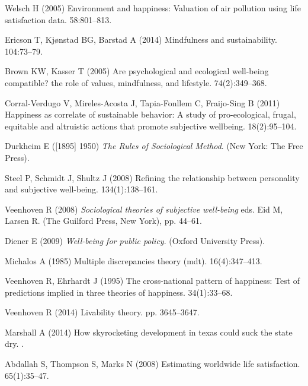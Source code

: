 \documentclass[10pt, letterpaper]{article}
\begin{document}
\begin{spacing}{1.4}
\begin{thebibliography}{10}
Welsch H (2005) Environment and happiness: Valuation of air pollution using
  life satisfaction data.
 58:801--813.

Ericson T, Kj{\o}nstad BG, Barstad A (2014) Mindfulness and sustainability.
 104:73--79.

Brown KW, Kasser T (2005) Are psychological and ecological well-being
  compatible? the role of values, mindfulness, and lifestyle.
 74(2):349--368.

Corral-Verdugo V, Mireles-Acosta J, Tapia-Fonllem C, Fraijo-Sing B (2011)
  Happiness as correlate of sustainable behavior: A study of pro-ecological,
  frugal, equitable and altruistic actions that promote subjective wellbeing.
 18(2):95--104.

Durkheim E ([1895] 1950) {\em The Rules of Sociological Method}.
\newblock (New York: The Free Press).

Steel P, Schmidt J, Shultz J (2008) Refining the relationship between
  personality and subjective well-being.
 134(1):138--161.

Veenhoven R (2008) {\em Sociological theories of subjective well-being} eds.{}
  Eid M, Larsen R.
\newblock (The Guilford Press, New York), pp. 44--61.

Diener E (2009) {\em Well-being for public policy}.
\newblock (Oxford University Press).

Michalos A (1985) Multiple discrepancies theory (mdt).
 16(4):347--413.

Veenhoven R, Ehrhardt J (1995) The cross-national pattern of happiness: Test of
  predictions implied in three theories of happiness.
 34(1):33--68.

Veenhoven R (2014) Livability theory.
 pp.
  3645--3647.

Marshall A (2014) How skyrocketing development in texas could suck the state
  dry.
.

Abdallah S, Thompson S, Marks N (2008) Estimating worldwide life satisfaction.
 65(1):35--47.


\end{thebibliography}
\end{spacing}
\end{document}

